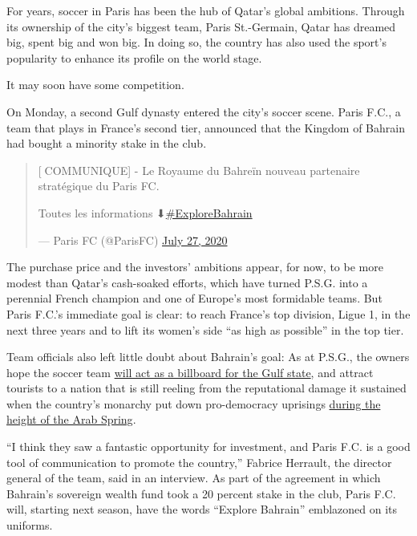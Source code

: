 For years, soccer in Paris has been the hub of Qatar's global ambitions.
Through its ownership of the city's biggest team, Paris St.-Germain,
Qatar has dreamed big, spent big and won big. In doing so, the country
has also used the sport's popularity to enhance its profile on the world
stage.

It may soon have some competition.

On Monday, a second Gulf dynasty entered the city's soccer scene. Paris
F.C., a team that plays in France's second tier, announced that the
Kingdom of Bahrain had bought a minority stake in the club.

\begin{quote}
{[}📝COMMUNIQUE{]} - Le Royaume du Bahreïn nouveau partenaire stratégique
du Paris FC.

Toutes les informations
⬇\href{https://twitter.com/hashtag/ExploreBahrain?src=hash\&ref_src=twsrc\%5Etfw}{\#ExploreBahrain}

--- Paris FC (@ParisFC)
\href{https://twitter.com/ParisFC/status/1287810680423424000?ref_src=twsrc\%5Etfw}{July
27, 2020}
\end{quote}

The purchase price and the investors' ambitions appear, for now, to be
more modest than Qatar's cash-soaked efforts, which have turned P.S.G.
into a perennial French champion and one of Europe's most formidable
teams. But Paris F.C.'s immediate goal is clear: to reach France's top
division, Ligue 1, in the next three years and to lift its women's side
``as high as possible'' in the top tier.

Team officials also left little doubt about Bahrain's goal: As at
P.S.G., the owners hope the soccer team
\href{https://parisfc.fr/a-la-une-paris-fc/communique-officiel-6/}{will
act as a billboard for the Gulf state}, and attract tourists to a nation
that is still reeling from the reputational damage it sustained when the
country's monarchy put down pro-democracy uprisings
\href{https://www.nytimes3xbfgragh.onion/2011/03/18/world/middleeast/18youth.html}{during
the height of the Arab Spring}.

``I think they saw a fantastic opportunity for investment, and Paris
F.C. is a good tool of communication to promote the country,'' Fabrice
Herrault, the director general of the team, said in an interview. As
part of the agreement in which Bahrain's sovereign wealth fund took a 20
percent stake in the club, Paris F.C. will, starting next season, have
the words ``Explore Bahrain'' emblazoned on its uniforms.

